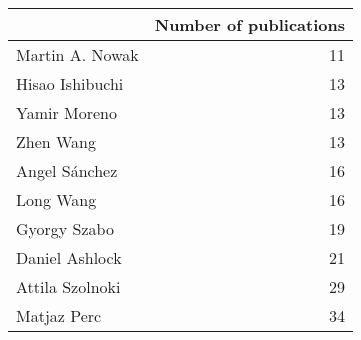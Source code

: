\begin{tabular}{lr}
\toprule
{} &  Number of publications \\
\midrule
Martin A. Nowak &                      11 \\
Hisao Ishibuchi &                      13 \\
Yamir Moreno    &                      13 \\
Zhen Wang       &                      13 \\
Angel Sánchez   &                      16 \\
Long Wang       &                      16 \\
Gyorgy Szabo    &                      19 \\
Daniel Ashlock  &                      21 \\
Attila Szolnoki &                      29 \\
Matjaz Perc     &                      34 \\
\bottomrule
\end{tabular}
